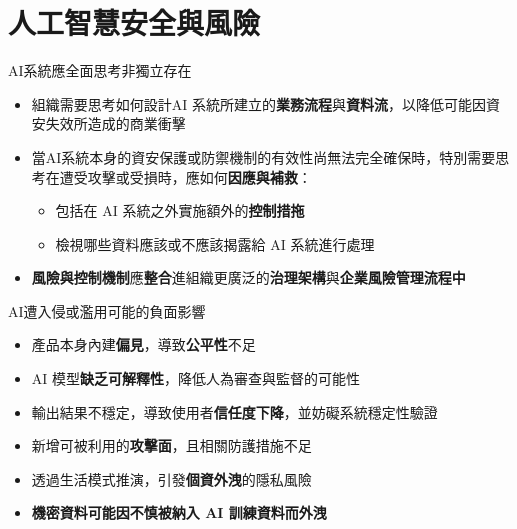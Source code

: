 \documentclass[aspectratio=1610]{Common/MyCourseBeamer}
\begin{document}
\section{人工智慧安全與風險}

\begin{frame}[allowframebreaks]{AI系統應全面思考非獨立存在}
	
	\begin{itemize}
		\item 組織需要思考如何設計AI 系統所建立的\textbf{業務流程}與\textbf{資料流}，以降低可能因資安失效所造成的商業衝擊
		
		\item 當AI系統本身的資安保護或防禦機制的有效性尚無法完全確保時，特別需要思考在遭受攻擊或受損時，應如何\textbf{因應與補救}：
			\begin{itemize}
				\item 包括在 AI 系統之外實施額外的\textbf{控制措拖}
				
				\item 檢視哪些資料應該或不應該揭露給 AI 系統進行處理
			\end{itemize}
		

		\item \textbf{風險與控制機制}應\textbf{整合}進組織更廣泛的\textbf{治理架構}與\textbf{企業風險管理流程中}
	\end{itemize}
	
\end{frame}

\begin{frame}[allowframebreaks]{AI遭入侵或濫用可能的負面影響}
	
	\begin{itemize}
		\item 產品本身內建\textbf{偏見}，導致\textbf{公平性}不足
		\item AI 模型\textbf{缺乏可解釋性}，降低人為審查與監督的可能性
		\item 輸出結果不穩定，導致使用者\textbf{信任度下降}，並妨礙系統穩定性驗證
		\item 新增可被利用的\textbf{攻擊面}，且相關防護措施不足
		\item 透過生活模式推演，引發\textbf{個資外洩}的隱私風險
		\item \textbf{機密資料可能因不慎被納入 AI 訓練資料而外洩}
	\end{itemize}
	
\end{frame}
\end{document}
